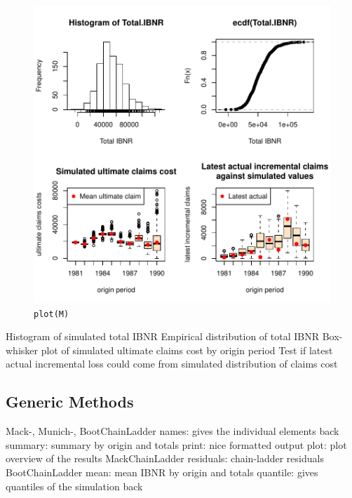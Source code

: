 \documentclass[a4paper]{article}
\begin{document}
\begin{figure}[h]
  \begin{center}
\includegraphics{ChainLadder-018}
    \caption{\texttt{plot(M)}}
  \end{center}
\end{figure}

Histogram of simulated total IBNR
Empirical distribution of total IBNR
Box-whisker plot of simulated ultimate claims cost by origin period
Test if latest actual incremental loss could come from simulated distribution of claims cost

\subsection{Generic Methods}

Mack-, Munich-, BootChainLadder
names: gives the individual elements back
summary: summary by origin and totals
print: nice formatted output
plot: plot overview of the results
MackChainLadder
residuals: chain-ladder residuals
BootChainLadder
mean: mean IBNR by origin and totals
quantile: gives quantiles of the simulation back
\end{document}
